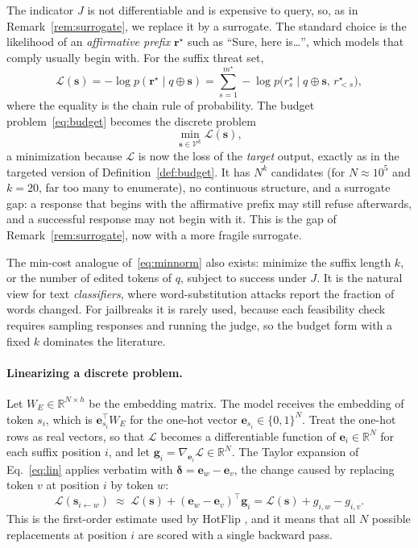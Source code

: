 \documentclass[10pt,a4paper]{extarticle}
\theoremstyle{definition}
\newcommand{\R}{\mathbb{R}}
\newcommand{\Loss}{\mathcal{L}}
\newcommand{\bdelta}{\boldsymbol{\delta}}
\begin{document}
The indicator \(J\) is not differentiable and is expensive to query, so, as in Remark~\ref{rem:surrogate}, we replace it by a surrogate. The standard choice is the likelihood of an \emph{affirmative prefix} \(\mathbf{r}^\star\) such as \enquote{Sure, here is\ldots}, which models that comply usually begin with. For the suffix threat set,
\begin{equation}\label{eq:llmloss}
\Loss(\mathbf{s})=-\log p(\mathbf{r}^\star\mid q\oplus\mathbf{s})=\sum_{s=1}^{m^\star}-\log p\big(r^\star_s\mid q\oplus\mathbf{s},\,r^\star_{<s}\big),
\end{equation}
where the equality is the chain rule of probability. The budget problem~\eqref{eq:budget} becomes the discrete problem
\begin{equation}\label{eq:llmbudget}
\min_{\mathbf{s}\in\mathcal{V}^k}\Loss(\mathbf{s}),
\end{equation}
a minimization because \(\Loss\) is now the loss of the \emph{target} output, exactly as in the targeted version of Definition~\ref{def:budget}. It has \(N^k\) candidates (for \(N\approx10^5\) and \(k=20\), far too many to enumerate), no continuous structure, and a surrogate gap: a response that begins with the affirmative prefix may still refuse afterwards, and a successful response may not begin with it. This is the gap of Remark~\ref{rem:surrogate}, now with a more fragile surrogate.

The min-cost analogue of~\eqref{eq:minnorm} also exists: minimize the suffix length \(k\), or the number of edited tokens of \(q\), subject to success under \(J\). It is the natural view for text \emph{classifiers}, where word-substitution attacks report the fraction of words changed. For jailbreaks it is rarely used, because each feasibility check requires sampling responses and running the judge, so the budget form with a fixed \(k\) dominates the literature.

\paragraph{Linearizing a discrete problem.} Let \(W_E\in\R^{N\times h}\) be the embedding matrix. The model receives the embedding of token \(s_i\), which is \(\mathbf{e}_{s_i}^\top W_E\) for the one-hot vector \(\mathbf{e}_{s_i}\in\{0,1\}^N\). Treat the one-hot rows as real vectors, so that \(\Loss\) becomes a differentiable function of \(\mathbf{e}_i\in\R^N\) for each suffix position \(i\), and let \(\mathbf{g}_i=\nabla_{\mathbf{e}_i}\Loss\in\R^N\). The Taylor expansion of Eq.~\eqref{eq:lin} applies verbatim with \(\bdelta=\mathbf{e}_w-\mathbf{e}_v\), the change caused by replacing token \(v\) at position \(i\) by token \(w\):
\[
\Loss(\mathbf{s}_{i\leftarrow w})\;\approx\;\Loss(\mathbf{s})+(\mathbf{e}_w-\mathbf{e}_v)^\top\mathbf{g}_i=\Loss(\mathbf{s})+g_{i,w}-g_{i,v}.
\]
This is the first-order estimate used by HotFlip \citep{ebrahimi2018hotflip}, and it means that all \(N\) possible replacements at position \(i\) are scored with a single backward pass.
\end{document}

